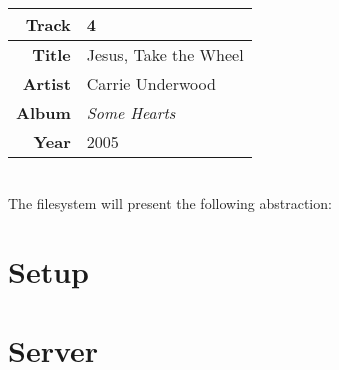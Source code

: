 \documentclass{article}
\begin{document}
	\begin{tabular}{| r | l |}
		\hline
		\textbf{Track} & 4 \\ \hline
		\textbf{Title} & Jesus, Take the Wheel \\ \hline
		\textbf{Artist} & Carrie Underwood \\ \hline
		\textbf{Album} & \textit{Some Hearts} \\ \hline 
		\textbf{Year} & 2005 \\ \hline
	\end{tabular} \\
	
	\noindent The filesystem will present the following abstraction: \\ 
	
	
	\section{Setup}
	\section{Server}
\end{document}
